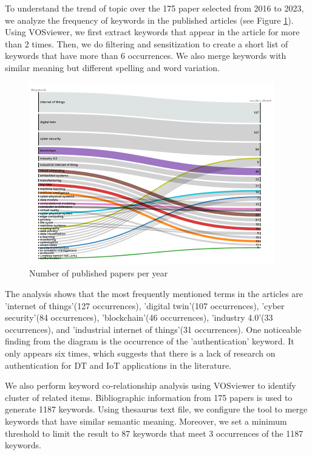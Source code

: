 To understand the trend of topic over the 175 paper selected from 2016 to 2023, we analyze the frequency of keywords in the published articles (see Figure \ref{fig:alluvial-key}). Using VOSviewer, we first extract keywords that appear in the article for more than 2 times. Then, we do filtering and sensitization to create a short list of keywords that have more than 6 occurrences. We also merge keywords with similar meaning but different spelling and word variation.  

\begin{figure}[ht]
    \centering
    \includegraphics[width=0.95\textwidth]{images/key_belt_png.png}
    \caption{Number of published papers per year}
    \label{fig:alluvial-key}
\end{figure}

The analysis shows that the most frequently mentioned terms in the articles are 'internet of things'(127 occurrences), 'digital twin'(107 occurrences), 'cyber security'(84 occurrences), 'blockchain'(46 occurrences), 'industry 4.0'(33 occurrences), and 'industrial internet of things'(31 occurrences). One noticeable finding from the diagram is the occurrence of the 'authentication' keyword. It only appears six times, which suggests that there is a lack of research on authentication for DT and IoT applications in the literature.  

We also perform keyword co-relationship analysis using VOSviewer to identify cluster of related items. Bibliographic information from 175 papers is used to generate 1187 keywords. Using thesaurus text file, we configure the tool to merge keywords that have similar semantic meaning. Moreover, we set a minimum threshold to limit the result to 87 keywords that meet 3 occurrences of the 1187 keywords.    

